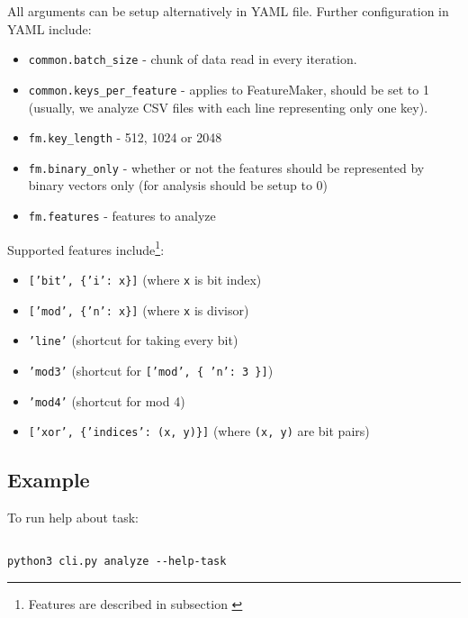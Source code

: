 \noindent
All arguments can be setup alternatively in YAML file. Further configuration in YAML include:

\begin{itemize}

\item \texttt{common.batch\_size} - chunk of data read in every iteration.
\item \texttt{common.keys\_per\_feature} - applies to FeatureMaker, should be set to 1 (usually, we analyze CSV files with each line representing only one key).
\item \texttt{fm.key\_length} - 512, 1024 or 2048
\item \texttt{fm.binary\_only} - whether or not the features should be represented by binary vectors only (for analysis should be setup to 0)
\item \texttt{fm.features} - features to analyze

\end{itemize}

\noindent
Supported features include\footnote{Features are described in subsection \label{feature-maker}}:

\begin{itemize}

\item \texttt{['bit', \{'i': x\}]} (where \texttt{x} is bit index)
\item \texttt{['mod', \{'n': x\}]} (where \texttt{x} is divisor)
\item \texttt{'line'} (shortcut for taking every bit) 
\item \texttt{'mod3'} (shortcut for \texttt{['mod', \{ 'n': 3 \}]})
\item \texttt{'mod4'} (shortcut for mod 4)
\item \texttt{['xor', \{'indices': (x, y)\}]} (where \texttt{(x, y)} are bit pairs)

\end{itemize}

\subsection*{Example}

To run help about task:

\begin{verbatim}

python3 cli.py analyze --help-task

\end{verbatim}


